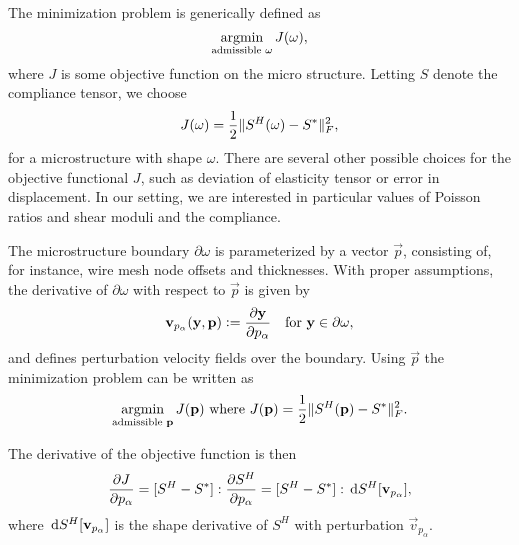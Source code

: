 \documentclass[twocolumn,10pt]{article}
\begin{document}
The minimization problem is generically defined as 
\begin{equation}
  \label{eqn:min}
  \operatorname*{argmin}_\text{admissible $\omega$} J(\omega),
\end{equation}
where $J$ is some objective function on the micro structure. Letting
$S$ denote the compliance tensor, we choose
\begin{equation}
  \label{eqn:compObjective}
  J(\omega) = \frac{1}{2}\lVert S^H(\omega) - S^*\rVert^2_F,
\end{equation}
for a microstructure with shape $\omega$. There are several other
possible choices for the objective functional $J$, such as deviation
of elasticity tensor or error in displacement. In our setting, we are
interested in particular values of Poisson ratios and shear moduli
and the compliance.

The microstructure boundary $\partial \omega$ is parameterized by a
vector $\vec{p}$, consisting of, for instance, wire mesh node offsets
and thicknesses. With proper assumptions, the derivative of $\partial
\omega$ with respect to $\vec{p}$ is given by
\begin{equation}
  \mathbf v_{p_\alpha}(\mathbf y,\mathbf p) \vcentcolon=
  \frac{\partial \mathbf y}{\partial p_\alpha}\quad\text{for } \mathbf y\in \partial\omega,
\end{equation}
and defines perturbation velocity fields over the boundary. Using
$\vec{p}$ the minimization problem can be written as
\begin{equation}
  \label{eqn:minParam}
  \operatorname*{argmin}_\text{admissible $\mathbf p$} J(\mathbf p)\text{ where }
  J(\mathbf p) = \frac{1}{2}\lVert S^H(\mathbf p) - S^*\rVert^2_F.
\end{equation}

The derivative of the objective function is then
\begin{equation}
  \label{eqn:paramJacobian}
  \frac{\partial J}{\partial p_\alpha} = [S^H - S^*]: \frac{\partial S^H}{\partial p_\alpha} = [S^H - S^*]: \, \mathrm{d} S^H[\mathbf v_{p_\alpha}],
\end{equation}
where $\, \mathrm{d} S^H[\mathbf v_{p_\alpha}]$ is the shape derivative of $S^H$
with perturbation $\vec{v}_{p_{\alpha}}$.
\end{document}
